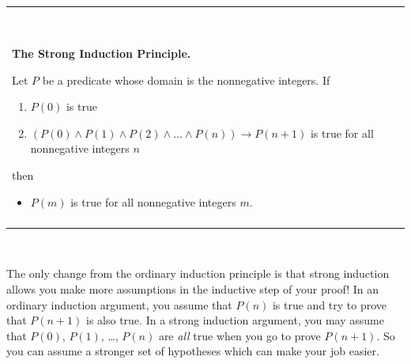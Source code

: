 \documentclass[11pt,oneside]{book}
\theoremstyle{definition}
\begin{document}
\

\noindent\begin{tabular}{|p{6.5in}|}
    \hline
    \

    \textbf{\huge The Strong Induction Principle.}

    Let $P$ be a predicate whose domain is the nonnegative integers.
    If
    \begin{enumerate}
        \item $P(0)$ is true

        \item $(P(0) \land P(1) \land P(2) \land \dots \land P(n)) \rightarrow P(n + 1)$ is true for all nonnegative integers $n$
    \end{enumerate}
    then
    \begin{itemize}
        \item $P(m)$ is true for all nonnegative integers $m$.
    \end{itemize}

    \\\\
    \hline
\end{tabular}

\

The only change from the ordinary induction principle is that strong induction allows you make more assumptions in the inductive step of your proof!
In an ordinary induction argument, you assume that $P(n)$ is true and try to prove that $P(n + 1)$ is also true.
In a strong induction argument, you may assume that $P(0)$,
$P(1)$, \dots, $P(n)$ are \emph{all} true when you go to prove $P(n + 1)$.
So you can assume a stronger set of hypotheses which can make your job easier.


%
\end{document}

